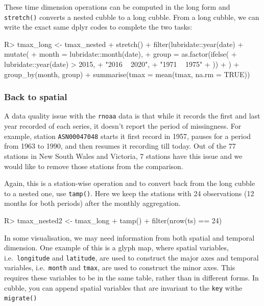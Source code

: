 \documentclass[
]{jss}
\begin{document}
These time dimension operations can be computed in the long form and
\texttt{stretch()} converts a nested cubble to a long cubble. From a
long cubble, we can write the exact same dplyr codes to complete the two
tasks:

\begin{CodeChunk}
\begin{CodeInput}
R> tmax_long <- tmax_nested %
+   stretch() %
+   filter(lubridate::year(date) %
+   mutate(
+     month = lubridate::month(date),
+     group = as.factor(ifelse(
+       lubridate::year(date) > 2015,
+       "2016 ~ 2020",
+       "1971 ~ 1975"
+     ))
+   ) %
+   group_by(month, group) %
+   summarise(tmax = mean(tmax, na.rm = TRUE))
\end{CodeInput}
\end{CodeChunk}

\hypertarget{back-to-spatial}{%
\subsubsection{Back to spatial}\label{back-to-spatial}}

A data quality issue with the \texttt{rnoaa} data is that while it
records the first and last year recorded of each series, it doesn't
report the period of missingness. For example, station
\texttt{ASN00047048} starts it first record in 1957, pauses for a period
from 1963 to 1990, and then resumes it recording till today. Out of the
77 stations in New South Wales and Victoria, 7 stations have this issue
and we would like to remove those stations from the comparison.

Again, this is a station-wise operation and to convert back from the
long cubble to a nested one, use \texttt{tamp()}. Here we keep the
stations with 24 observations (12 months for both periods) after the
monthly aggregation.

\begin{CodeChunk}
\begin{CodeInput}
R> tmax_nested2 <- tmax_long %
+   tamp() %
+   filter(nrow(ts) == 24)
\end{CodeInput}
\end{CodeChunk}

In some visualisation, we may need information from both spatial and
temporal dimension. One example of this is a glyph map, where spatial
variables, i.e.~\texttt{longitude} and \texttt{latitude}, are used to
construct the major axes and temporal variables, i.e.~\texttt{month} and
\texttt{tmax}, are used to construct the minor axes. This requires these
variables to be in the same table, rather than in different forms. In
cubble, you can append spatial variables that are invariant to the
\texttt{key} withe \texttt{migrate()}
\end{document}
